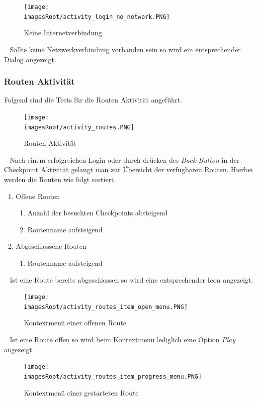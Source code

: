 \documentclass[11pt, a4paper, twoside]{article}   	%
\newcommand{\imagesRoot}{images}
\begin{document}
\begin{figure}[h]
	\centering
	\texttt{[image: \\imagesRoot/activity\_login\_no\_network.PNG]}
	\caption
	{Keine Internetverbindung}
\end{figure}
\ \newline
Sollte keine Netzwerkverbindung vorhanden sein so wird ein entsprechender Dialog angezeigt.
\newline
\subsubsection{Routen Aktivität}
Folgend sind die Tests für die Routen Aktivität angeführt.
\begin{figure}[h]
	\centering
	\texttt{[image: \\imagesRoot/activity\_routes.PNG]}
	\caption
	{Routen Aktivität}
\end{figure}
\ \newline
Nach einem erfolgreichen Login oder durch drücken des \emph{Back Button} in der Checkpoint Aktivität gelangt man zur Übersicht der verfügbaren Routen. Hierbei werden die Routen wie folgt sortiert.
\begin{enumerate}
	\item Offene Routen
	\begin{enumerate}
		\item 
	Anzahl der besuchten Checkpoints absteigend
		\item Routenname aufsteigend
	\end{enumerate}
	\item Abgeschlossene Routen
	\begin{enumerate}
		\item Routenname aufsteigend
	\end{enumerate}
\end{enumerate}
\ \newline
Ist eine Route bereits abgeschlossen so wird eine entsprechender Icon angezeigt.
\newpage
\begin{figure}[h]
	\centering
	\texttt{[image: \\imagesRoot/activity\_routes\_item\_open\_menu.PNG]}
	\caption
	{Kontextmenü einer offenen Route}
\end{figure}
\ \newline
Ist eine Route offen so wird beim Kontextmenü lediglich eine Option \emph{Play} angezeigt.
\newline
\begin{figure}[h]
	\centering
	\texttt{[image: \\imagesRoot/activity\_routes\_item\_progress\_menu.PNG]}
	\caption
	{Kontextmenü einer gestarteten Route}
\end{figure}
\end{document}

